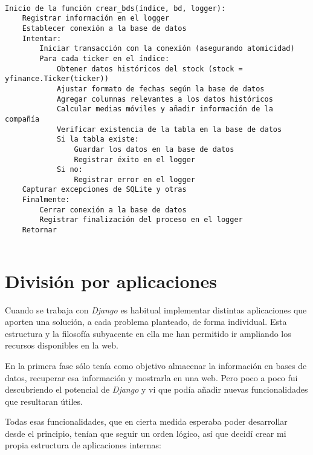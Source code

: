 \begin{verbatim}

Inicio de la función crear_bds(índice, bd, logger):
    Registrar información en el logger
    Establecer conexión a la base de datos
    Intentar:
        Iniciar transacción con la conexión (asegurando atomicidad)
        Para cada ticker en el índice:
            Obtener datos históricos del stock (stock = yfinance.Ticker(ticker))
            Ajustar formato de fechas según la base de datos
            Agregar columnas relevantes a los datos históricos
            Calcular medias móviles y añadir información de la compañía
            Verificar existencia de la tabla en la base de datos
            Si la tabla existe:
                Guardar los datos en la base de datos
                Registrar éxito en el logger
            Si no:
                Registrar error en el logger
    Capturar excepciones de SQLite y otras
    Finalmente:
        Cerrar conexión a la base de datos
        Registrar finalización del proceso en el logger
    Retornar
                
\end{verbatim}

\section{División por aplicaciones}

Cuando se trabaja con \emph{Django} es habitual implementar distintas aplicaciones que aporten una solución, a cada problema planteado, de forma individual. Esta estructura y la filosofía subyacente en ella me han permitido ir ampliando los recursos disponibles en la web. 

En la primera fase sólo tenía como objetivo almacenar la información en bases de datos, recuperar esa información y mostrarla en una web. Pero poco a poco fui descubriendo el potencial de \emph{Django} y vi que podía añadir nuevas funcionalidades que resultaran útiles. 

Todas esas funcionalidades, que en cierta medida esperaba poder desarrollar desde el principio, tenían que seguir un orden lógico, así que decidí crear mi propia estructura de aplicaciones internas:

